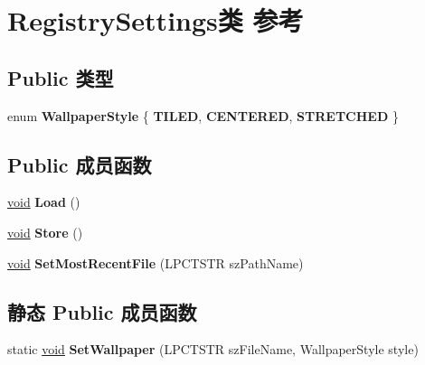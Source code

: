 \hypertarget{class_registry_settings}{}\section{Registry\+Settings类 参考}
\label{class_registry_settings}
\subsection*{Public 类型}
\begin{DoxyCompactItemize}
\item 
\mbox{\label{class_registry_settings_a70638ea1cc0904368deba4c23e725d75}} 
enum {\bfseries Wallpaper\+Style} \{ {\bfseries T\+I\+L\+ED}, 
{\bfseries C\+E\+N\+T\+E\+R\+ED}, 
{\bfseries S\+T\+R\+E\+T\+C\+H\+ED}
 \}
\end{DoxyCompactItemize}
\subsection*{Public 成员函数}
\begin{DoxyCompactItemize}
\item 
\mbox{\label{class_registry_settings_a52e7ef6ef12c644c102214b536a1f06d}} 
\hyperlink{interfacevoid}{void} {\bfseries Load} ()
\item 
\mbox{\label{class_registry_settings_affe398a7644d57324eb3a25a39585a6b}} 
\hyperlink{interfacevoid}{void} {\bfseries Store} ()
\item 
\mbox{\label{class_registry_settings_a5352797f5f4bf6e55668f43d05c56eff}} 
\hyperlink{interfacevoid}{void} {\bfseries Set\+Most\+Recent\+File} (L\+P\+C\+T\+S\+TR sz\+Path\+Name)
\end{DoxyCompactItemize}
\subsection*{静态 Public 成员函数}
\begin{DoxyCompactItemize}
\item 
\mbox{\label{class_registry_settings_a49ece4225f3da0424ebd45fe916c9f29}} 
static \hyperlink{interfacevoid}{void} {\bfseries Set\+Wallpaper} (L\+P\+C\+T\+S\+TR sz\+File\+Name, Wallpaper\+Style style)
\end{DoxyCompactItemize}
